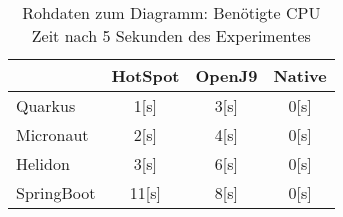 \begin{table}[h]
    \centering
    \begin{tabular}{l|ccc}
        \hline
        & HotSpot & OpenJ9 & Native \\
        \hline
        Quarkus & 1[s] & 3[s] & 0[s] \\
        Micronaut & 2[s] & 4[s] & 0[s] \\
        Helidon & 3[s] & 6[s] & 0[s] \\
        SpringBoot & 11[s] & 8[s] & 0[s] \\
        \hline
    \end{tabular}
    \caption{Rohdaten zum Diagramm: Benötigte CPU Zeit nach 5 Sekunden des Experimentes}
\end{table}
